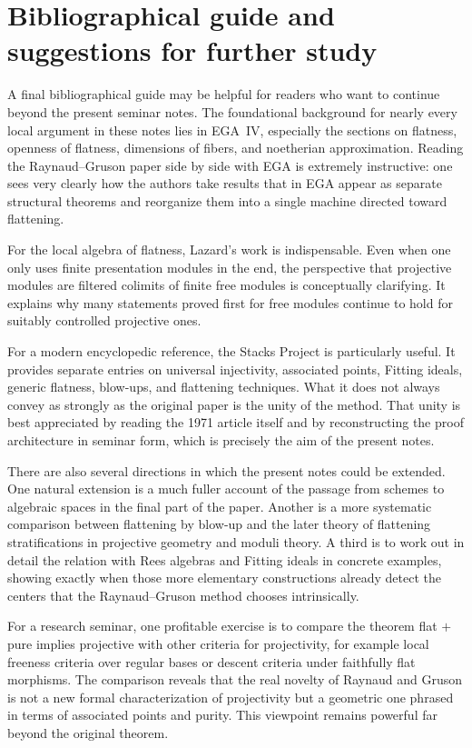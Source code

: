 \documentclass[11pt,oneside]{article}
\begin{document}
\section{Bibliographical guide and suggestions for further study}

A final bibliographical guide may be helpful for readers who want to continue beyond the present seminar notes.  The foundational background for nearly every local argument in these notes lies in EGA~IV, especially the sections on flatness, openness of flatness, dimensions of fibers, and noetherian approximation.  Reading the Raynaud--Gruson paper side by side with EGA is extremely instructive: one sees very clearly how the authors take results that in EGA appear as separate structural theorems and reorganize them into a single machine directed toward flattening.

For the local algebra of flatness, Lazard's work is indispensable.  Even when one only uses finite presentation modules in the end, the perspective that projective modules are filtered colimits of finite free modules is conceptually clarifying.  It explains why many statements proved first for free modules continue to hold for suitably controlled projective ones.

For a modern encyclopedic reference, the Stacks Project is particularly useful.  It provides separate entries on universal injectivity, associated points, Fitting ideals, generic flatness, blow-ups, and flattening techniques.  What it does not always convey as strongly as the original paper is the unity of the method.  That unity is best appreciated by reading the 1971 article itself and by reconstructing the proof architecture in seminar form, which is precisely the aim of the present notes.

There are also several directions in which the present notes could be extended.  One natural extension is a much fuller account of the passage from schemes to algebraic spaces in the final part of the paper.  Another is a more systematic comparison between flattening by blow-up and the later theory of flattening stratifications in projective geometry and moduli theory.  A third is to work out in detail the relation with Rees algebras and Fitting ideals in concrete examples, showing exactly when those more elementary constructions already detect the centers that the Raynaud--Gruson method chooses intrinsically.

For a research seminar, one profitable exercise is to compare the theorem flat $+$ pure implies projective with other criteria for projectivity, for example local freeness criteria over regular bases or descent criteria under faithfully flat morphisms.  The comparison reveals that the real novelty of Raynaud and Gruson is not a new formal characterization of projectivity but a geometric one phrased in terms of associated points and purity.  This viewpoint remains powerful far beyond the original theorem.
\end{document}
